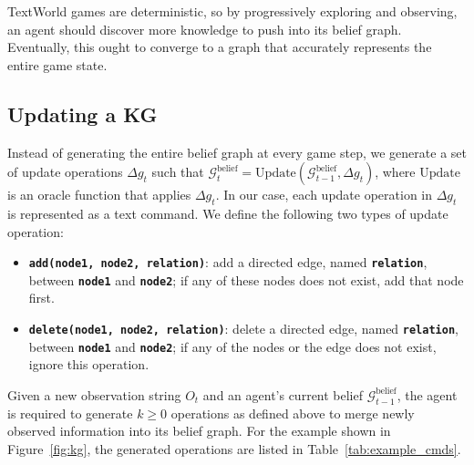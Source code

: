 \documentclass{article}
\newcommand{\code}[1]{\texttt{#1}}
\newcommand{\cmd}[1]{\textbf{\small{\code{#1}}}}
\newcommand\marc[1]{\textcolor{blue}{Marc: #1}}
\begin{document}
TextWorld games are deterministic, so by progressively exploring and observing, an agent should discover more knowledge to push into its belief graph. Eventually, this ought to converge to a graph that accurately represents the entire game state.

\subsection{Updating a KG}
\label{section:how}

Instead of generating the entire belief graph at every game step, we generate a set of update operations $\Delta g_t$ such that $\mathcal{G}^\text{belief}_t = \text{Update}(\mathcal{G}^\text{belief}_{t-1}, \Delta g_t)$, 
where $\text{Update}$ is an oracle function that applies $\Delta g_t$. 
In our case, each update operation in $\Delta g_t$ is represented as a text command. 
We define the following two types of update operation:
\begin{itemize}
    \item \cmd{add(node1, node2, relation)}: add a directed edge, named \cmd{relation}, between \cmd{node1} and \cmd{node2}; if any of these nodes does not exist, add that node first.
    \item \cmd{delete(node1, node2, relation)}: delete a directed edge, named \cmd{relation}, between \cmd{node1} and \cmd{node2}; if any of the nodes or the edge does not exist, ignore this operation. 
\end{itemize}

Given a new observation string $O_t$ and an agent's current belief $\mathcal{G}^\text{belief}_{t-1}$, the agent is required to generate $k\geq 0$ operations as defined above to merge newly observed information into its belief graph.
For the example shown in Figure~\ref{fig:kg}, the generated operations are listed in Table~\ref{tab:example_cmds}.
\end{document}
